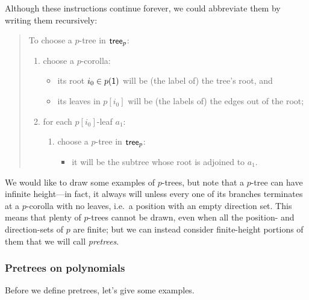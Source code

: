 \documentclass[Book-Poly]{subfiles}
\begin{document}
Although these instructions continue forever, we could abbreviate them by writing them recursively:
\begin{quote}
To choose a $p$-tree in $\mathsf{tree}_p$: 
\begin{enumerate}
    \item choose a $p$-corolla:
    \begin{itemize}
        \item its root $i_0\in p(\textsf{1})$ will be (the label of) the tree's root, and
        \item its leaves in $p[i_0]$ will be (the labels of) the edges out of the root;
    \end{itemize}
    \item for each $p[i_0]$-leaf $a_1$:
    \begin{enumerate}[label*=\arabic*.]
        \item choose a $p$-tree in $\mathsf{tree}_p$:
        \begin{itemize}
            \item it will be the subtree whose root is adjoined to $a_1$. 
        \end{itemize}
    \end{enumerate}
\end{enumerate}
\end{quote}

We would like to draw some examples of $p$-trees, but note that a $p$-tree can have infinite height---in fact, it always will unless every one of its branches terminates at a $p$-corolla with no leaves, i.e.\ a position with an empty direction set.
This means that plenty of $p$-trees cannot be drawn, even when all the position- and direction-sets of $p$ are finite; but we can instead consider finite-height portions of them that we will call \emph{pretrees}.

\subsubsection{Pretrees on polynomials}

Before we define pretrees, let's give some examples. 
\end{document}
